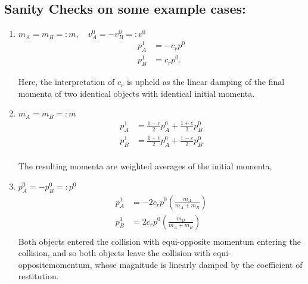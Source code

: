 \documentclass[a4paper,11pt, oneside]{article}
\begin{document}
\subsection{Sanity Checks on some example cases:}
\begin{enumerate}
    \item $m_A = m_B =:m,\quad v_A^0 = -v_B^0 =: v^0$
\begin{align*}
    p_A^1 &= -c_r p^0\\
    p_B^1 &= c_r p^0.
\end{align*}
    
    Here, the interpretation of $c_r$ is upheld as the linear damping of the final momenta of two identical objects with identical initial momenta.
    
    \item $m_A = m_B =:m$
\begin{align*}
    p_A^1 &= \frac{1-c}{2}p_A^0 + \frac{1+c}{2}p_B^0\\
    p_B^1 &= \frac{1+c}{2}p_A^0 + \frac{1-c}{2}p_B^0\\
\end{align*}

The resulting momenta are weighted averages of the initial momenta, 

    \item $p_A^0 = -p_B^0 =: p^0$
\begin{align*}
    p_A^1 &= -2c_rp^0\left(\frac{m_A}{m_A + m_B}\right)\\
    p_B^1 &= 2c_rp^0\left(\frac{m_B}{m_A + m_B}\right)\\
\end{align*}
Both objects entered the collision with equi-opposite momentum entering the collision, and so both objects leave the collision with equi-oppositemomentum, whose magnitude is linearly damped by the coefficient of restitution.
\end{enumerate}
\end{document}
